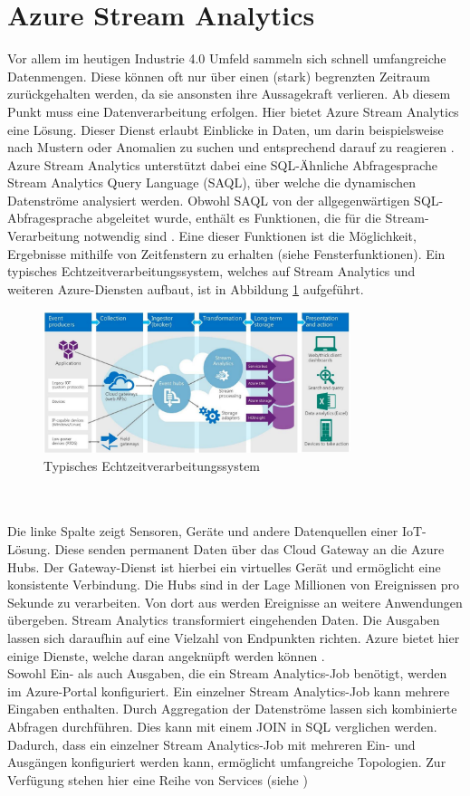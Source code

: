 \section{Azure Stream Analytics}
Vor allem im heutigen Industrie 4.0 Umfeld sammeln sich schnell umfangreiche Datenmengen. Diese können oft nur über einen (stark) begrenzten Zeitraum zurückgehalten werden, da sie ansonsten ihre Aussagekraft verlieren. Ab diesem Punkt muss eine Datenverarbeitung erfolgen. Hier bietet Azure Stream Analytics eine Lösung. Dieser Dienst erlaubt Einblicke in Daten, um darin beispielsweise nach Mustern oder Anomalien zu suchen und entsprechend darauf zu reagieren \cite{Klein.2017}. Azure Stream Analytics unterstützt dabei eine SQL-Ähnliche Abfragesprache Stream Analytics Query Language (SAQL), über welche die dynamischen Datenströme analysiert werden. Obwohl SAQL von der allgegenwärtigen SQL-Abfragesprache abgeleitet wurde, enthält es Funktionen, die für die Stream-Verarbeitung notwendig sind \cite{Prosise.}. Eine dieser Funktionen ist die Möglichkeit, Ergebnisse mithilfe von Zeitfenstern zu erhalten (siehe Fensterfunktionen). Ein typisches Echtzeitverarbeitungssystem, welches auf Stream Analytics und weiteren Azure-Diensten aufbaut, ist in Abbildung \ref{uebersicht} aufgeführt.
\begin{figure}[ht]
	\centering
	\includegraphics[width=0.8\textwidth,]{images/StreamAnalytics}
	\caption{Typisches Echtzeitverarbeitungssystem \cite{Prosise.}}
	\label{uebersicht}
\end{figure}
\\ \\Die linke Spalte zeigt Sensoren, Geräte und andere Datenquellen einer IoT-Lösung. Diese senden permanent Daten über das Cloud Gateway an die Azure Hubs. Der Gateway-Dienst ist hierbei ein virtuelles Gerät und ermöglicht eine konsistente Verbindung. Die Hubs sind in der Lage Millionen von Ereignissen pro Sekunde zu verarbeiten. Von dort aus werden Ereignisse an weitere Anwendungen übergeben. Stream Analytics transformiert eingehenden Daten. Die Ausgaben lassen sich daraufhin auf eine Vielzahl von Endpunkten richten. Azure bietet hier einige Dienste, welche daran angeknüpft werden können \cite{Prosise.}. \\
Sowohl Ein- als auch Ausgaben, die ein Stream Analytics-Job benötigt, werden im Azure-Portal konfiguriert. Ein einzelner Stream Analytics-Job kann mehrere Eingaben enthalten. Durch Aggregation der Datenströme lassen sich kombinierte Abfragen durchführen. Dies kann mit einem JOIN in SQL verglichen werden. Dadurch, dass ein einzelner Stream Analytics-Job mit mehreren Ein- und Ausgängen konfiguriert werden kann, ermöglicht umfangreiche Topologien. Zur Verfügung stehen hier eine Reihe von Services (siehe  \cite{Prosise.})

